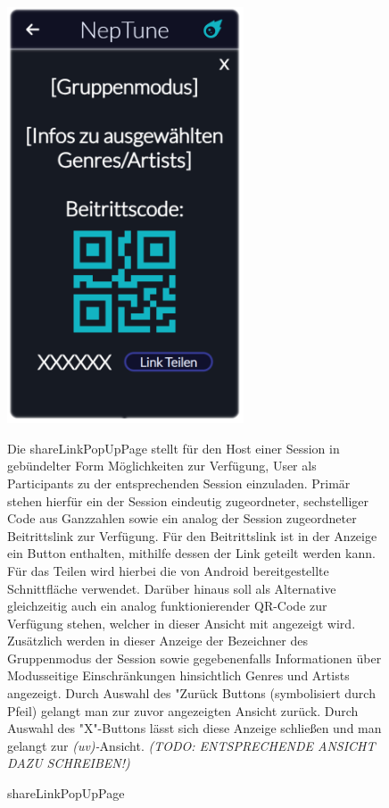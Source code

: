 \documentclass[oneside, ngerman]{sdqtechreport}
\begin{document}
\begin{figure}
    \hypertarget{shareLinkPopUpPage}{}
    \begin{minipage}[t]{7 cm}
        \vspace{-1.5ex}
        \includegraphics[width=7cm]{LATEX/Pflichtenheft/GraphicDesigns/shareLinkPopUpPage.png}
        \caption{shareLinkPopUpPage}
    \end{minipage}
    \hspace{1cm}
    \begin{minipage}[t]{7 cm}
        \vspace{1cm}
        Die shareLinkPopUpPage stellt für den Host einer Session in gebündelter Form Möglichkeiten zur Verfügung,  User als Participants zu der entsprechenden Session einzuladen. Primär stehen hierfür ein der Session eindeutig zugeordneter, sechstelliger Code aus Ganzzahlen sowie ein analog der Session zugeordneter Beitrittslink zur Verfügung. Für den Beitrittslink ist in der Anzeige ein Button enthalten, mithilfe dessen der Link geteilt werden kann. Für das Teilen wird hierbei die von Android bereitgestellte Schnittfläche verwendet. Darüber hinaus soll als Alternative gleichzeitig auch ein analog funktionierender QR-Code zur Verfügung stehen, welcher in dieser Ansicht mit angezeigt wird. Zusätzlich werden in dieser Anzeige der Bezeichner des Gruppenmodus der Session sowie gegebenenfalls Informationen über Modusseitige Einschränkungen hinsichtlich Genres und Artists angezeigt. Durch Auswahl des "Zurück
 Buttons (symbolisiert durch Pfeil) gelangt man zur zuvor angezeigten Ansicht zurück. Durch Auswahl des "X"-Buttons lässt sich diese Anzeige schließen und man gelangt zur \textit{(uv)-}Ansicht. \textit{(TODO: ENTSPRECHENDE ANSICHT DAZU SCHREIBEN!)}
 \end{minipage}
\end{figure}
\end{document}
